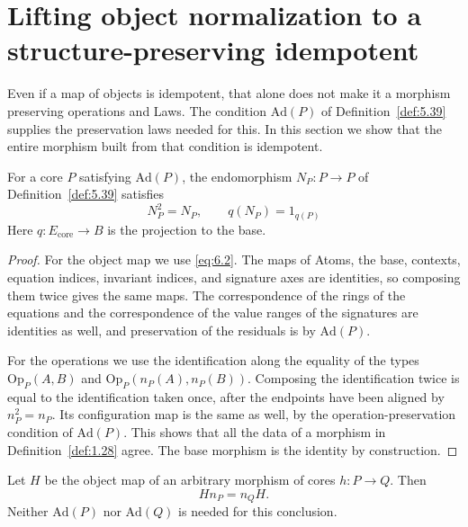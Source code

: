 \section{Lifting object normalization to a structure-preserving idempotent}\label{sec:6.2}

Even if a map of objects is idempotent, that alone does not make it a morphism preserving
operations and Laws.
The condition $\mathrm{Ad}(P)$ of Definition~\ref{def:5.39} supplies the preservation laws
needed for this.
In this section we show that the entire morphism built from that condition is idempotent.

\begin{theorem}\label{thm:6.5}

For a core $P$ satisfying $\mathrm{Ad}(P)$, the endomorphism
$N_P:P\to P$ of Definition~\ref{def:5.39} satisfies
\begin{equation*}
N_P^2=N_P,\qquad q(N_P)=1_{q(P)}
\tag{6.6}\label{eq:6.6}
\end{equation*}
Here $q:E_{\mathrm{core}}\to B$ is the projection to the base.

\end{theorem}

\begin{proof}

For the object map we use \eqref{eq:6.2}.
The maps of Atoms, the base, contexts, equation indices, invariant indices, and signature
axes are identities, so composing them twice gives the same maps.
The correspondence of the rings of the equations and the correspondence of the value ranges
of the signatures are identities as well, and preservation of the residuals is by
$\mathrm{Ad}(P)$.

For the operations we use the identification along the equality of the types
$\mathrm{Op}_P(A,B)$ and $\mathrm{Op}_P(n_P(A),n_P(B))$.
Composing the identification twice is equal to the identification taken once, after the
endpoints have been aligned by $n_P^2=n_P$.
Its configuration map is the same as well, by the operation-preservation condition of
$\mathrm{Ad}(P)$.
This shows that all the data of a morphism in Definition~\ref{def:1.28} agree.
The base morphism is the identity by construction.

\end{proof}

\begin{lemma}\label{lem:6.6}

Let $H$ be the object map of an arbitrary morphism of cores $h:P\to Q$. Then
\begin{equation*}
Hn_P=n_QH.
\tag{6.7}\label{eq:6.7}
\end{equation*}
Neither $\mathrm{Ad}(P)$ nor $\mathrm{Ad}(Q)$ is needed for this conclusion.

\end{lemma}

